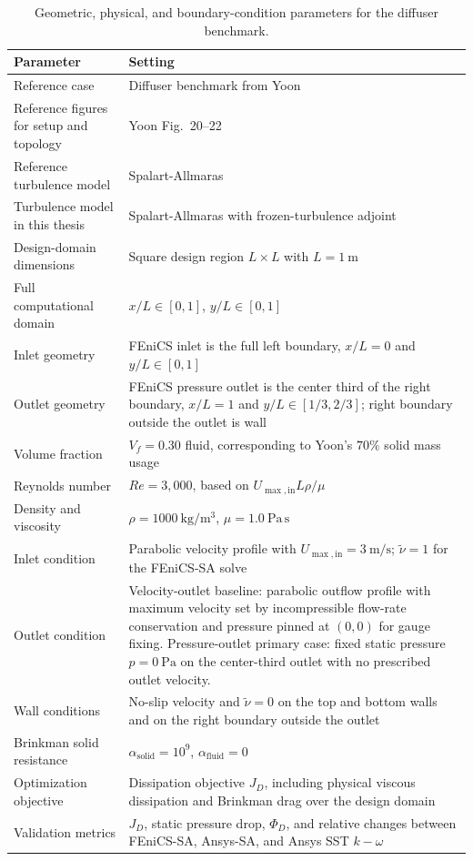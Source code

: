 \begin{table}[htbp]
	\centering
	\footnotesize
	\caption{Geometric, physical, and boundary-condition parameters for the diffuser benchmark.}
	\label{tab:app_B_yoon_diffuser_physical}
	\renewcommand{\arraystretch}{1.2}
	\begin{tabularx}{\textwidth}{l X}
		\hline
		\textbf{Parameter} & \textbf{Setting} \\
		\hline
		Reference case & Diffuser benchmark from Yoon~\cite{Yoon2016} \\
		Reference figures for setup and topology & Yoon Fig.~20--22 \\
		Reference turbulence model & Spalart-Allmaras \\
		Turbulence model in this thesis & Spalart-Allmaras with frozen-turbulence adjoint \\
		Design-domain dimensions & Square design region $L\times L$ with $L=1~\mathrm{m}$ \\
		Full computational domain & $x/L\in[0,1]$, $y/L\in[0,1]$ \\
			Inlet geometry & FEniCS inlet is the full left boundary, $x/L=0$ and $y/L\in[0,1]$ \\
			Outlet geometry & FEniCS pressure outlet is the center third of the right boundary, $x/L=1$ and $y/L\in[1/3,2/3]$; right boundary outside the outlet is wall \\
		Volume fraction & $V_f=0.30$ fluid, corresponding to Yoon's $70\%$ solid mass usage \\
		Reynolds number & $Re=3{,}000$, based on $U_{\max,\mathrm{in}}L\rho/\mu$ \\
		Density and viscosity & $\rho=1000~\mathrm{kg/m^3}$, $\mu=1.0~\mathrm{Pa\,s}$ \\
			Inlet condition & Parabolic velocity profile with $U_{\max,\mathrm{in}}=3~\mathrm{m/s}$; $\tilde{\nu}=1$ for the FEniCS-SA solve \\
			Outlet condition & Velocity-outlet baseline: parabolic outflow profile with maximum velocity set by incompressible flow-rate conservation and pressure pinned at $(0,0)$ for gauge fixing. Pressure-outlet primary case: fixed static pressure $p=0~\mathrm{Pa}$ on the center-third outlet with no prescribed outlet velocity. \\
		Wall conditions & No-slip velocity and $\tilde{\nu}=0$ on the top and bottom walls and on the right boundary outside the outlet \\
		Brinkman solid resistance & $\alpha_{\mathrm{solid}}=10^9$, $\alpha_{\mathrm{fluid}}=0$ \\
		Optimization objective & Dissipation objective $J_D$, including physical viscous dissipation and Brinkman drag over the design domain \\
		Validation metrics & $J_D$, static pressure drop, $\Phi_D$, and relative changes between FEniCS-SA, Ansys-SA, and Ansys SST $k-\omega$ \\
		\hline
	\end{tabularx}
\end{table}

